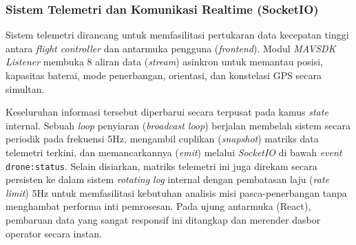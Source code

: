 \subsubsection{Sistem Telemetri dan Komunikasi Realtime (SocketIO)}
Sistem telemetri dirancang untuk memfasilitasi pertukaran data kecepatan tinggi antara \textit{flight controller} dan antarmuka pengguna (\textit{frontend}). Modul \textit{MAVSDK Listener} membuka 8 aliran data (\textit{stream}) asinkron untuk memantau posisi, kapasitas baterai, mode penerbangan, orientasi, dan konstelasi GPS secara simultan.

Keseluruhan informasi tersebut diperbarui secara terpusat pada kamus \textit{state} internal. Sebuah \textit{loop} penyiaran (\textit{broadcast loop}) berjalan membelah sistem secara periodik pada frekuensi 5Hz, mengambil cuplikan (\textit{snapshot}) matriks data telemetri terkini, dan memancarkannya (\textit{emit}) melalui \textit{SocketIO} di bawah \textit{event} \texttt{drone:status}. Selain disiarkan, matriks telemetri ini juga direkam secara persisten ke dalam sistem \textit{rotating log} internal dengan pembatasan laju (\textit{rate limit}) 5Hz untuk memfasilitasi kebutuhan analisis misi pasca-penerbangan tanpa menghambat performa inti pemrosesan. Pada ujung antarmuka (React), pembaruan data yang sangat responsif ini ditangkap dan merender dasbor operator secara instan.

